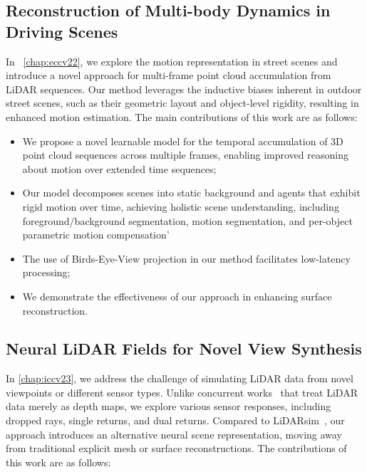 \subsection{Reconstruction of Multi-body Dynamics in Driving Scenes}
In ~\cref{chap:eccv22}, we explore the motion representation in street scenes and introduce a novel approach for multi-frame point cloud accumulation from LiDAR sequences. Our method leverages the inductive biases inherent in outdoor street scenes, such as their geometric layout and object-level rigidity, resulting in enhanced motion estimation. The main contributions of this work are as follows:

\begin{itemize}
\item We propose a novel learnable model for the temporal accumulation of 3D point cloud sequences across multiple frames, enabling improved reasoning about motion over extended time sequences;
\item Our model decomposes scenes into static background and agents that exhibit rigid motion over time, achieving holistic scene understanding, including foreground/background segmentation, motion segmentation, and per-object parametric motion compensation'
\item The use of Birds-Eye-View projection in our method facilitates low-latency processing;
\item We demonstrate the effectiveness of our approach in enhancing surface reconstruction.
\end{itemize}

\subsection{Neural LiDAR Fields for Novel View Synthesis}
In \cref{chap:iccv23}, we address the challenge of simulating LiDAR data from novel viewpoints or different sensor types. Unlike concurrent works~\cite{zhang2023nerflidar,tao2023lidarnerf} that treat LiDAR data merely as depth maps, we explore various sensor responses, including dropped rays, single returns, and dual returns. Compared to LiDARsim~\cite{manivasagam2020lidarsim}, our approach introduces an alternative neural scene representation, moving away from traditional explicit mesh or surface reconstructions. The contributions of this work are as follows:

